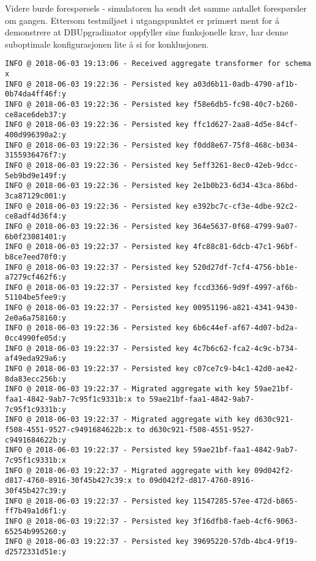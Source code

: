 Videre burde forespørsels - simulatoren ha sendt det samme antallet forespørsler om gangen. Ettersom testmiljøet i utgangspunktet er primært ment for å demonstrere at DBUpgradinator oppfyller sine funksjonelle krav, har denne suboptimale konfigurasjonen lite å si for konklusjonen.

\begin{lstlisting}[basicstyle=\footnotesize, label={testlog}, caption={De første 50 linjene i den applikasjonsloggen til tjeneren vbb\-master2018\-crabbe (se tabell \ref{droplets}) fra test 2.}]
INFO @ 2018-06-03 19:13:06 - Received aggregate transformer for schema x
INFO @ 2018-06-03 19:22:36 - Persisted key a03d6b11-0adb-4790-af1b-0b74da4ff46f:y
INFO @ 2018-06-03 19:22:36 - Persisted key f58e6db5-fc98-40c7-b260-ce8ace6deb37:y
INFO @ 2018-06-03 19:22:36 - Persisted key ffc1d627-2aa8-4d5e-84cf-400d996390a2:y
INFO @ 2018-06-03 19:22:36 - Persisted key f0dd8e67-75f8-468c-b034-3155936476f7:y
INFO @ 2018-06-03 19:22:36 - Persisted key 5eff3261-8ec0-42eb-9dcc-5eb9bd9e149f:y
INFO @ 2018-06-03 19:22:36 - Persisted key 2e1b0b23-6d34-43ca-86bd-3ca87129c001:y
INFO @ 2018-06-03 19:22:36 - Persisted key e392bc7c-cf3e-4dbe-92c2-ce8adf4d36f4:y
INFO @ 2018-06-03 19:22:36 - Persisted key 364e5637-0f68-4799-9a07-6b0f23081401:y
INFO @ 2018-06-03 19:22:37 - Persisted key 4fc88c81-6dcb-47c1-96bf-b8ce7eed70f0:y
INFO @ 2018-06-03 19:22:37 - Persisted key 520d27df-7cf4-4756-bb1e-a7279cf462f6:y
INFO @ 2018-06-03 19:22:37 - Persisted key fccd3366-9d9f-4997-af6b-51104be5fee9:y
INFO @ 2018-06-03 19:22:37 - Persisted key 00951196-a821-4341-9430-2e0a6a758160:y
INFO @ 2018-06-03 19:22:36 - Persisted key 6b6c44ef-af67-4d07-bd2a-0cc4990fe05d:y
INFO @ 2018-06-03 19:22:37 - Persisted key 4c7b6c62-fca2-4c9c-b734-af49eda929a6:y
INFO @ 2018-06-03 19:22:37 - Persisted key c07ce7c9-b4c1-42d0-ae42-8da83ecc256b:y
INFO @ 2018-06-03 19:22:37 - Migrated aggregate with key 59ae21bf-faa1-4842-9ab7-7c95f1c9331b:x to 59ae21bf-faa1-4842-9ab7-7c95f1c9331b:y
INFO @ 2018-06-03 19:22:37 - Migrated aggregate with key d630c921-f508-4551-9527-c9491684622b:x to d630c921-f508-4551-9527-c9491684622b:y
INFO @ 2018-06-03 19:22:37 - Persisted key 59ae21bf-faa1-4842-9ab7-7c95f1c9331b:x
INFO @ 2018-06-03 19:22:37 - Migrated aggregate with key 09d042f2-d817-4760-8916-30f45b427c39:x to 09d042f2-d817-4760-8916-30f45b427c39:y
INFO @ 2018-06-03 19:22:37 - Persisted key 11547285-57ee-472d-b865-ff7b49a1d6f1:y
INFO @ 2018-06-03 19:22:37 - Persisted key 3f16dfb8-faeb-4cf6-9063-65254b995260:y
INFO @ 2018-06-03 19:22:37 - Persisted key 39695220-57db-4bc4-9f19-d2572331d51e:y

\end{lstlisting}
